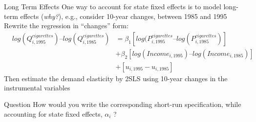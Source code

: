 \documentclass[notes,10pt, aspectratio=169]{beamer}
\begin{document}
\begin{frame}{Long Term Effects}
One way to account for state fixed effects is to model long-term effects (\textit{why?}), e.g., consider 10-year changes, between 1985 and 1995\\[.25em]

Rewrite the regression in “changes” form:
\begin{eqnarray*}
    &log(Q^{cigarettes}_{i,1995})\text{--}log(Q^{cigarettes}_{i,1985}) &= \beta_1 [log(P^{cigarettes}_{i,  1995}\text{--}log(P^{cigarettes}_{i,  1985})]\\
    & {} &+ \beta_2 [log(Income_{i,  1995})\text{--}log(Income_{i,  1985})]\\
    & {} &+ [u_{i,  1995}-u_{i,  1985}]
\end{eqnarray*}
Then estimate the demand elasticity by 2SLS using 10-year changes in the instrumental variables

\begin{exampleblock}{Question}
    How would you write the corresponding short-run specification, while accounting for state fixed effects, $\alpha_i$ ? 
\end{exampleblock}


\end{frame}
\end{document}
